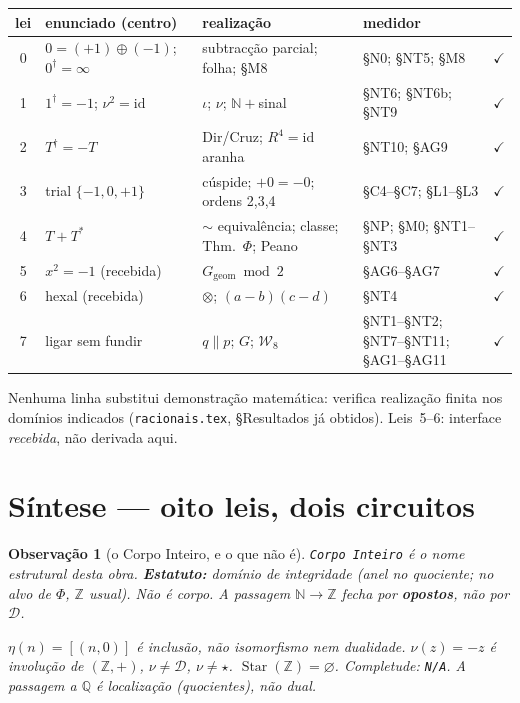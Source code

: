 \documentclass[11pt,a4paper]{article}
\newtheorem{observacao}{Observação}
\newcommand{\code}[1]{\texttt{\small #1}}
\newcommand{\dg}{^{\dagger}}
\newcommand{\Word}{\mathcal{W}}
\begin{document}
\begin{center}\scriptsize
\begin{tabular}{@{}cllll@{}}
\toprule
lei & enunciado (centro) & realização & medidor & \\
\midrule
0 & $0=(+1)\oplus(-1)$; $0\dg=\infty$
  & subtracção parcial; folha; §M8 & §N0; §NT5; §M8 & $\checkmark$ \\
1 & $1\dg=-1$; $\nu^{2}=\mathrm{id}$
  & $\iota$; $\nu$; $\mathbb{N}+{}$sinal & §NT6; §NT6b; §NT9 & $\checkmark$ \\
2 & $T\dg=-T$
  & Dir/Cruz; $R^{4}=\mathrm{id}$ aranha & §NT10; §AG9 & $\checkmark$ \\
3 & trial $\{-1,0,+1\}$
  & cúspide; $+0=-0$; ordens 2,3,4 & §C4--§C7; §L1--§L3 & $\checkmark$ \\
4 & $T+T^{*}$
  & $\sim$ equivalência; classe; Thm.\ $\Phi$; Peano & §NP; §M0; §NT1--§NT3 & $\checkmark$ \\
5 & $x^{2}=-1$ (recebida)
  & $G_{\mathrm{geom}}\bmod2$ & §AG6--§AG7 & $\checkmark$ \\
6 & hexal (recebida)
  & $\otimes$; $(a-b)(c-d)$ & §NT4 & $\checkmark$ \\
7 & ligar sem fundir
  & $q\parallel p$; $G$; $\Word_8$ & §NT1--§NT2; §NT7--§NT11; §AG1--§AG11 & $\checkmark$ \\
\bottomrule
\end{tabular}
\end{center}

\noindent Nenhuma linha substitui demonstração matemática: verifica realização
finita nos domínios indicados (\code{racionais.tex}, §Resultados já obtidos).
Leis~5--6: interface \emph{recebida}, não derivada aqui.

\section*{Síntese --- oito leis, dois circuitos}

\begin{observacao}[o Corpo Inteiro, e o que não é]
\texttt{Corpo Inteiro} é o nome estrutural desta obra. \textbf{Estatuto:}
domínio de integridade (anel no quociente; no alvo de $\Phi$, $\mathbb{Z}$
usual). Não é corpo. A passagem $\mathbb{N}\to\mathbb{Z}$ fecha por
\textbf{opostos}, não por $\mathcal{D}$.

$\eta(n)=[(n,0)]$ é inclusão, não isomorfismo nem dualidade.
$\nu(z)=-z$ é involução de $(\mathbb{Z},+)$, $\nu\neq\mathcal{D}$, $\nu\neq\star$.
$\operatorname{Star}(\mathbb{Z})=\varnothing$. Completude: \texttt{N/A}.
A passagem a $\mathbb{Q}$ é localização (quocientes), não dual.
\end{observacao}
\end{document}
